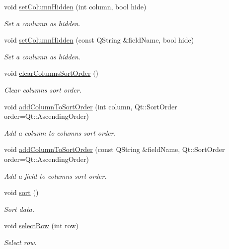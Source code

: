 \begin{DoxyCompactItemize}
void \hyperlink{classmdt_sql_selection_dialog_a8b7f8d24a959533ebe434443f19920c7}{set\-Column\-Hidden} (int column, bool hide)
\begin{DoxyCompactList}\small\item\em Set a coulumn as hidden. \end{DoxyCompactList}\item 
void \hyperlink{classmdt_sql_selection_dialog_a163280676920829583a4888b742fc96c}{set\-Column\-Hidden} (const Q\-String \&field\-Name, bool hide)
\begin{DoxyCompactList}\small\item\em Set a coulumn as hidden. \end{DoxyCompactList}\item 
void \hyperlink{classmdt_sql_selection_dialog_a82df70e51cdc408dfbb9cd1047392403}{clear\-Columns\-Sort\-Order} ()
\begin{DoxyCompactList}\small\item\em Clear columns sort order. \end{DoxyCompactList}\item 
void \hyperlink{classmdt_sql_selection_dialog_a9fe80365b3e41f88b0879fc098b8f6c0}{add\-Column\-To\-Sort\-Order} (int column, Qt\-::\-Sort\-Order order=Qt\-::\-Ascending\-Order)
\begin{DoxyCompactList}\small\item\em Add a column to columns sort order. \end{DoxyCompactList}\item 
void \hyperlink{classmdt_sql_selection_dialog_a594df719c71d852e9ca318d729ec14d3}{add\-Column\-To\-Sort\-Order} (const Q\-String \&field\-Name, Qt\-::\-Sort\-Order order=Qt\-::\-Ascending\-Order)
\begin{DoxyCompactList}\small\item\em Add a field to columns sort order. \end{DoxyCompactList}\item 
void \hyperlink{classmdt_sql_selection_dialog_a34941e9927a0af3a2c052356da2d36bd}{sort} ()
\begin{DoxyCompactList}\small\item\em Sort data. \end{DoxyCompactList}\item 
void \hyperlink{classmdt_sql_selection_dialog_a5e651cd0ca9398e8fc876f5e88b21121}{select\-Row} (int row)
\begin{DoxyCompactList}\small\item\em Select row. \end{DoxyCompactList}\item 

\end{DoxyCompactItemize}
